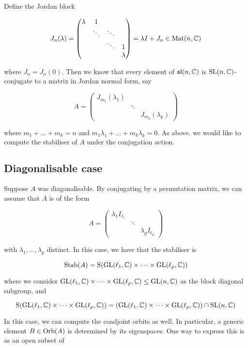 \documentclass{article}
\renewcommand{\sl}{\mfs\mfl}
\newcommand{\rS}{\mathrm{S}}
\begin{document}
Define the Jordan block

\[J_n(\lambda) = \begin{pmatrix}
    \lambda & 1 \\
    & \ddots & \ddots \\
    & & \ddots & 1 \\
    & & & \lambda
\end{pmatrix} = \lambda I + J_n \in \operatorname{Mat}(n, \mathbb{C})\]

where \(J_n = J_n(0)\). Then we know that every element of \(\sl(n, \C)\) is \(\operatorname{SL}(n, \mathbb{C})\)-conjugate to a matrix in Jordan normal form, say

\[A = \begin{pmatrix}
    J_{m_1}(\lambda_1) \\
    & \ddots \\
    & & J_{m_k}(\lambda_k)
\end{pmatrix}\]

where \(m_1 + \dots + m_k = n\) and \(m_1\lambda_1 + \dots + m_k\lambda_k = 0\). As above, we would like to compute the stabiliser of \(A\) under the conjugation action.

\subsection{Diagonalisable case}

Suppose \(A\) was diagonalisable. By conjugating by a permutation matrix, we can assume that \(A\) is of the form

\[A = \begin{pmatrix}
    \lambda_1 I_{\ell_1} \\
    & \ddots \\
    & & \lambda_p I_{\ell_p}
\end{pmatrix}\]

with \(\lambda_1, \dots, \lambda_p\) distinct. In this case, we have that the stabiliser is

\[\Stab(A) = \rS(\GL(\ell_1, \C) \times \cdots \times \GL(\ell_p, \C))\]

where we consider \(\operatorname{GL}(\ell_1, \mathbb{C}) \times \cdots \times \operatorname{GL}(\ell_p, \mathbb{C}) \le \operatorname{GL}(n, \mathbb{C})\) as the block diagonal subgroup, and

\[\rS(\GL(\ell_1, \C) \times \cdots \times \GL(\ell_p, \C)) = \left(\GL(\ell_1, \C) \times \cdots \times \GL(\ell_p, \C)\right) \cap \SL(n, \C)\]

In this case, we can compute the coadjoint orbits as well. In particular, a generic element \(B \in \operatorname{Orb}(A)\) is determined by its eigenspaces. One way to express this is as an open subset of
\end{document}
